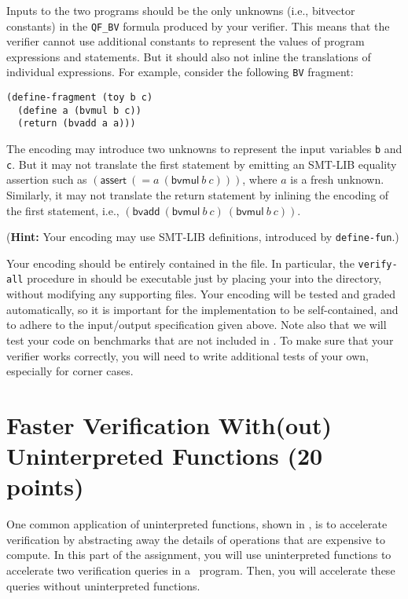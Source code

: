 \documentclass{handout}
\begin{document}
\begin{questions}
Inputs to the two programs should be the only unknowns (i.e., bitvector
constants) in the \texttt{QF\_BV} formula produced by your verifier.  This means
that the verifier cannot use additional constants to represent the values of
program expressions and statements.  But it should also not inline the
translations of individual expressions.  For example, consider the following
\texttt{BV} fragment:


\begin{lstlisting}
(define-fragment (toy b c)
  (define a (bvmul b c))
  (return (bvadd a a)))
\end{lstlisting}
\label{prob:impl}

The encoding may introduce two unknowns to represent the input variables
\texttt{b} and \texttt{c}.  But it may not translate the first statement by
emitting an SMT-LIB equality assertion such as $(\mathsf{assert}\ (= a\
(\mathsf{bvmul}\ b\ c)))$, where $a$ is a fresh unknown.  Similarly, it may not
translate the return statement by inlining the encoding of the first statement,
i.e., $(\mathsf{bvadd}\ (\mathsf{bvmul}\ b\ c)\ (\mathsf{bvmul}\ b\ c))$.

\medskip
(\textbf{Hint:}  Your encoding may use SMT-LIB definitions, introduced by \texttt{define-fun}.)
\medskip

Your encoding should be entirely contained in the  file.
In particular, the \texttt{verify-all} procedure in \src[bvv/]{tests.rkt} should
be executable just by placing your \src[bvv/]{verifier.rkt} into the \src{bvv}
directory, without modifying any supporting files.  Your encoding will be tested
and graded automatically, so it is important for the implementation to be
self-contained, and to adhere to the input/output specification given above.
Note also that we will test your code on benchmarks that are not included in
\src[bvv/]{tests.rkt}.  To make sure that your verifier works correctly, you
will need to write additional tests of your own, especially for corner cases.





\end{questions}


\section{Faster Verification With(out) Uninterpreted Functions (20 points)}

One common application of uninterpreted functions, shown in , is to
accelerate verification by abstracting away the details of operations that are
expensive to compute.  In this part of the assignment, you will use
uninterpreted functions to accelerate two verification queries in a \rosette\
program.  Then, you will accelerate these queries without uninterpreted
functions.
\end{document}
